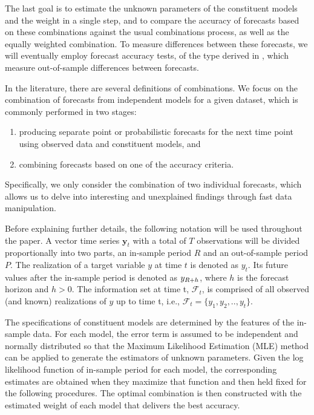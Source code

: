 \documentclass{monashthesis}
\begin{document}
The last goal is to estimate the unknown parameters of the constituent models and the weight in a single step, and to compare the accuracy of forecasts based on these combinations against the usual combinations process, as well as the equally weighted combination. To measure differences between these forecasts, we will eventually employ forecast accuracy tests, of the type derived in \textcite{W96}, which measure out-of-sample differences between forecasts.

In the literature, there are several definitions of combinations. We focus on the combination of forecasts from independent models for a given dataset, which is commonly performed in two stages:

\begin{enumerate}
\def\labelenumi{\arabic{enumi}.}
\item
  producing separate point or probabilistic forecasts for the next time point using observed data and constituent models, and
\item
  combining forecasts based on one of the accuracy criteria.
\end{enumerate}

Specifically, we only consider the combination of two individual forecasts, which allows us to delve into interesting and unexplained findings through fast data manipulation.

Before explaining further details, the following notation will be used throughout the paper. A vector time series \(\textbf{y}_t\) with a total of \(T\) observations will be divided proportionally into two parts, an in-sample period \(R\) and an out-of-sample period \(P\). The realization of a target variable \(y\) at time \(t\) is denoted as \(y_{t}\). Its future values after the in-sample period is denoted as \(y_{\small{R+h}}\), where \(h\) is the forecast horizon and \(h>0\). The information set at time t, \(\mathcal{F}_t\), is comprised of all observed (and known) realizations of \(y\) up to time t, i.e., \(\mathcal{F}_t = \{y_1, y_2, .., y_t\}\).

The specifications of constituent models are determined by the features of the in-sample data. For each model, the error term is assumed to be independent and normally distributed so that the Maximum Likelihood Estimation (MLE) method can be applied to generate the estimators of unknown parameters. Given the log likelihood function of in-sample period for each model, the corresponding estimates are obtained when they maximize that function and then held fixed for the following procedures. The optimal combination is then constructed with the estimated weight of each model that delivers the best accuracy.
\end{document}
